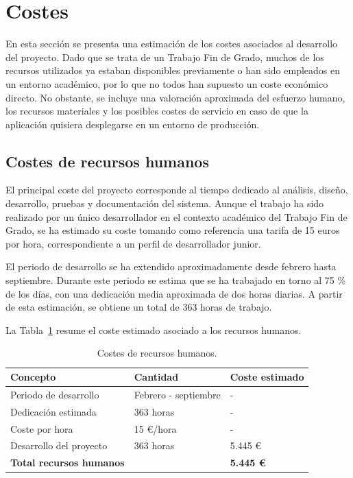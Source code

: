 \section{Costes}

En esta sección se presenta una estimación de los costes asociados al desarrollo del proyecto. Dado que se trata de un Trabajo Fin de Grado, muchos de los recursos utilizados ya estaban disponibles previamente o han sido empleados en un entorno académico, por lo que no todos han supuesto un coste económico directo. No obstante, se incluye una valoración aproximada del esfuerzo humano, los recursos materiales y los posibles costes de servicio en caso de que la aplicación quisiera desplegarse en un entorno de producción.

\subsection{Costes de recursos humanos}

El principal coste del proyecto corresponde al tiempo dedicado al análisis, diseño, desarrollo, pruebas y documentación del sistema. Aunque el trabajo ha sido realizado por un único desarrollador en el contexto académico del Trabajo Fin de Grado, se ha estimado su coste tomando como referencia una tarifa de 15 euros por hora, correspondiente a un perfil de desarrollador junior.

El periodo de desarrollo se ha extendido aproximadamente desde febrero hasta septiembre. Durante este periodo se estima que se ha trabajado en torno al 75 \% de los días, con una dedicación media aproximada de dos horas diarias. A partir de esta estimación, se obtiene un total de 363 horas de trabajo.

La Tabla~\ref{tab:costes_recursos_humanos} resume el coste estimado asociado a los recursos humanos.

\begin{table}[H]
\centering
\caption{Costes de recursos humanos.}
\label{tab:costes_recursos_humanos}
\renewcommand{\arraystretch}{1.2}
\begin{tabular}{|p{5cm}|p{4cm}|p{4cm}|}
\hline
\textbf{Concepto} & \textbf{Cantidad} & \textbf{Coste estimado} \\ \hline

Periodo de desarrollo &
Febrero - septiembre &
- \\ \hline

Dedicación estimada &
363 horas &
- \\ \hline

Coste por hora &
15 \euro/hora &
- \\ \hline

Desarrollo del proyecto &
363 horas &
5.445 \euro \\ \hline

\textbf{Total recursos humanos} &
&
\textbf{5.445 \euro} \\ \hline

\end{tabular}
\end{table}

